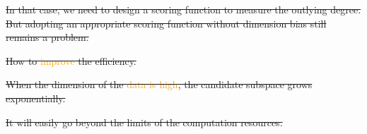 \documentclass[
 size=14pt,
 paper=smartboard,  %
 mode=present, 		%
 display=slides, 	%
 style=tuliplab,  	%
 pauseslide,
 fleqn,leqno]{powerdot}
\providecommand{\DIFdeltex}[1]{{\protect\color{red}\sout{#1}}}                      %
\providecommand{\DIFdelbegin}{} %
\providecommand{\DIFdelend}{} %
\providecommand{\DIFdel}[1]{\texorpdfstring{\DIFdeltex{#1}}{}} %
\newcommand{\DIFscaledelfig}{0.5}
\newlength{\DIFdelgraphicswidth} %
\newlength{\DIFdelgraphicsheight} %
\newcommand{\DIFdelincludegraphics}[2][]{%
\sbox{\DIFdelgraphicsbox}{\DIFOincludegraphics[#1]{#2}}%
\settoboxwidth{\DIFdelgraphicswidth}{\DIFdelgraphicsbox} %
\settoboxtotalheight{\DIFdelgraphicsheight}{\DIFdelgraphicsbox} %
\scalebox{\DIFscaledelfig}{%
\parbox[b]{\DIFdelgraphicswidth}{\usebox{\DIFdelgraphicsbox}\\[-\baselineskip] \rule{\DIFdelgraphicswidth}{0em}}\llap{\resizebox{\DIFdelgraphicswidth}{\DIFdelgraphicsheight}{%
\setlength{\unitlength}{\DIFdelgraphicswidth}%
\begin{picture}(1,1)%
\thicklines\linethickness{2pt} %
{\color[rgb]{1,0,0}\put(0,0){\framebox(1,1){}}}%
{\color[rgb]{1,0,0}\put(0,0){\line( 1,1){1}}}%
{\color[rgb]{1,0,0}\put(0,1){\line(1,-1){1}}}%
\end{picture}%
}\hspace*{3pt}}} %
} %
\DeclareRobustCommand{\DIFdelbegin}{\DIFOdelbegin \let\includegraphics\DIFdelincludegraphics} %
\DeclareRobustCommand{\DIFdelend}{\DIFOaddend \let\includegraphics\DIFOincludegraphics} %
\begin{document}
\DIFdelbegin \DIFdel{In that case,
we need to design a scoring function to measure the outlying degree.
But adopting an appropriate scoring function without dimension bias still remains a problem.
}%
\DIFdelend %

\DIFdelbegin %
\DIFdelend %
\DIFdelbegin %

\DIFdelend %
\DIFdelbegin %
\DIFdelend %

\DIFdelbegin %
\DIFdel{How to \textcolor{orange}{improve} the efficiency.
}\DIFdelend %

\DIFdelbegin %
\DIFdelend %

\DIFdelbegin %
\DIFdel{When the dimension of the \textcolor{orange}{data is high},
the candidate subspace grows exponentially.
}\DIFdelend %

\DIFdelbegin %
\DIFdel{It will easily go beyond the limits of the computation resources.
}\DIFdelend %
\end{document}
